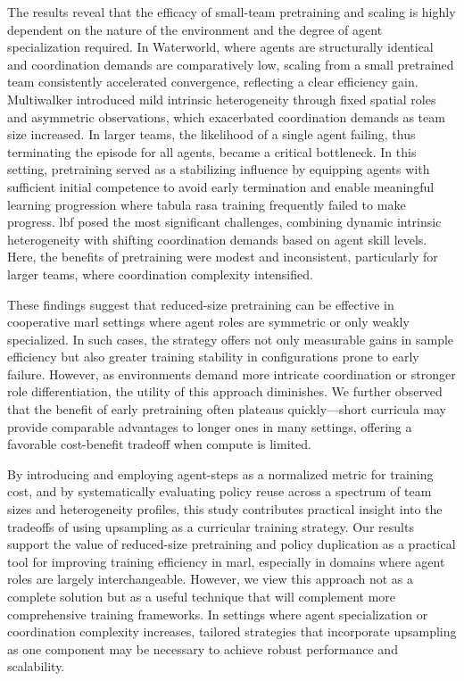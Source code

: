 \documentclass{article}
\begin{document}
The results reveal that the efficacy of small-team pretraining and scaling is highly dependent 
on the nature of the environment and the degree of agent specialization required. 
In Waterworld, 
where agents are structurally identical and coordination demands are comparatively low, 
scaling from a small pretrained team consistently accelerated convergence, 
reflecting a clear efficiency gain. 
Multiwalker introduced mild intrinsic heterogeneity through fixed spatial roles and 
asymmetric observations, which exacerbated coordination demands as team size increased. 
In larger teams, the likelihood of a single agent failing, thus terminating the episode 
for all agents, became a critical bottleneck. In this setting, pretraining served as a 
stabilizing influence by equipping agents with sufficient initial competence to avoid 
early termination and enable meaningful learning progression where tabula rasa training 
frequently failed to make progress.
\gls{lbf} posed the most significant challenges, 
combining dynamic intrinsic heterogeneity with shifting coordination 
demands based on agent skill levels. 
Here, the benefits of pretraining were modest and inconsistent, 
particularly for larger teams, where coordination complexity intensified.

These findings suggest that reduced-size pretraining can be effective in cooperative \gls{marl} 
settings where agent roles are symmetric or only weakly specialized. In such cases, 
the strategy offers not only measurable gains in sample efficiency but also greater 
training stability in configurations prone to early failure. However, as environments 
demand more intricate coordination or stronger role differentiation, the utility of 
this approach diminishes. We further observed that the benefit of early pretraining 
often plateaus quickly—short curricula may provide comparable advantages to longer 
ones in many settings, offering a favorable cost-benefit tradeoff when compute is limited.

By introducing and employing agent-steps as a normalized metric for training cost, and by 
systematically evaluating policy reuse across a spectrum of team sizes and heterogeneity 
profiles, this study contributes practical insight into the tradeoffs of using upsampling 
as a curricular training strategy. Our results support the value of reduced-size pretraining 
and policy duplication as a practical tool for improving training efficiency in \gls{marl}, 
especially in domains where agent roles are largely interchangeable. However, we view 
this approach not as a complete solution but as a useful technique that will complement 
more comprehensive training frameworks. In settings where agent specialization or 
coordination complexity increases, tailored strategies that incorporate upsampling as 
one component may be necessary to achieve robust performance and scalability.
\end{document}
